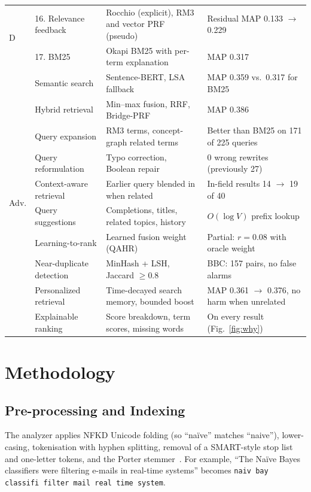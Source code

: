 \documentclass[conference]{IEEEtran}
\begin{document}
\begin{table}[t]
\begin{tabular}{@{}llp{6.0cm}p{5.3cm}@{}}
\midrule
\multirow{2}{*}{D} & 16. Relevance feedback & Rocchio (explicit), RM3 and vector PRF (pseudo) & Residual MAP 0.133 $\rightarrow$ 0.229 \\
& 17. BM25 & Okapi BM25 with per-term explanation & MAP 0.317 \\
\midrule
\multirow{10}{*}{Adv.} & Semantic search & Sentence-BERT, LSA fallback & MAP 0.359 vs.\ 0.317 for BM25 \\
& Hybrid retrieval & Min--max fusion, RRF, Bridge-PRF & MAP 0.386 \\
& Query expansion & RM3 terms, concept-graph related terms & Better than BM25 on 171 of 225 queries \\
& Query reformulation & Typo correction, Boolean repair & 0 wrong rewrites (previously 27) \\
& Context-aware retrieval & Earlier query blended in when related & In-field results 14 $\rightarrow$ 19 of 40 \\
& Query suggestions & Completions, titles, related topics, history & $O(\log V)$ prefix lookup \\
& Learning-to-rank & Learned fusion weight (QAHR) & \textcolor{orange!80!black}{Partial}: $r=0.08$ with oracle weight \\
& Near-duplicate detection & MinHash + LSH, Jaccard $\geq 0.8$ & BBC: 157 pairs, no false alarms \\
& Personalized retrieval & Time-decayed search memory, bounded boost & MAP 0.361 $\rightarrow$ 0.376, no harm when unrelated \\
& Explainable ranking & Score breakdown, term scores, missing words & On every result (Fig.~\ref{fig:why}) \\
\bottomrule
\end{tabular}
\end{table}

\section{Methodology}
\subsection{Pre-processing and Indexing}
The analyzer applies NFKD Unicode folding (so ``na\"ive'' matches ``naive''), lower-casing, tokenisation with hyphen splitting, removal of a SMART-style stop list and one-letter tokens, and the Porter stemmer~\cite{porter1980}. For example, ``The Na\"ive Bayes classifiers were filtering e-mails in real-time systems'' becomes \texttt{naiv bay classifi filter mail real time system}.
\end{document}
